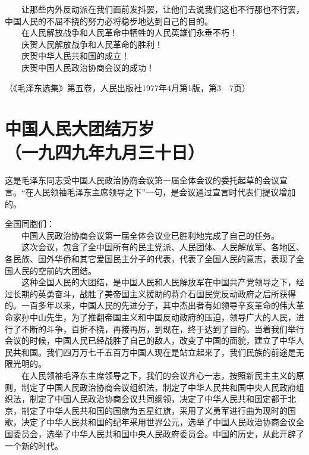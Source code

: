 \documentclass[cn,11pt,chinese]{elegantbook}
\def\myformat#1{\hfil\hfil #1}
\begin{document}
　　让那些内外反动派在我们面前发抖罢，让他们去说我们这也不行那也不行罢，中国人民的不屈不挠的努力必将稳步地达到自己的目的。\\
　　在人民解放战争和人民革命中牺牲的人民英雄们永垂不朽！\\
　　庆贺人民解放战争和人民革命的胜利！\\
　　庆贺中华人民共和国的成立！\\
　　庆贺中国人民政治协商会议的成功！\\
\begin{flushright}（《毛泽东选集》第五卷，人民出版社1977年4月第1版，第3—7页）\end{flushright}
\newpage\section*{\myformat{中国人民大团结万岁}\\\myformat{（一九四九年九月三十日）}}
\begin{introduction}\item  这是毛泽东同志受中国人民政治协商会议第一届全体会议的委托起草的会议宣言。“在人民领袖毛泽东主席领导之下”一句，是会议通过宣言时代表们提议增加的。\end{introduction}
全国同胞们：\\
　　中国人民政治协商会议第一届全体会议业已胜利地完成了自己的任务。\\
　　这次会议，包含了全中国所有的民主党派、人民团体、人民解放军、各地区、各民族、国外华侨和其它爱国民主分子的代表，代表了全国人民的意志，表现了全国人民的空前的大团结。\\
　　这种全国人民的大团结，是中国人民和人民解放军在中国共产党领导之下，经过长期的英勇奋斗，战胜了美帝国主义援助的蒋介石国民党反动政府之后所获得的。一百多年以来，中国人民的先进分子，其中杰出者有如领导辛亥革命的伟大革命家孙中山先生，为了推翻帝国主义和中国反动政府的压迫，领导广大的人民，进行了不断的斗争，百折不挠，再接再厉，到现在，终于达到了目的。当着我们举行会议的时候，中国人民已经战胜了自己的敌人，改变了中国的面貌，建立了中华人民共和国。我们四万万七千五百万中国人现在是站立起来了，我们民族的前途是无限光明的。\\
　　在人民领袖毛泽东主席领导之下，我们的会议齐心一志，按照新民主主义的原则，制定了中国人民政治协商会议组织法，制定了中华人民共和国中央人民政府组织法，制定了中国人民政治协商会议共同纲领，决定了中华人民共和国定都于北京，制定了中华人民共和国的国旗为五星红旗，采用了义勇军进行曲为现时的国歌，决定了中华人民共和国的纪年采用世界公元，选举了中国人民政治协商会议全国委员会，选举了中华人民共和国中央人民政府委员会。中国的历史，从此开辟了一个新的时代。\\
\end{document}
